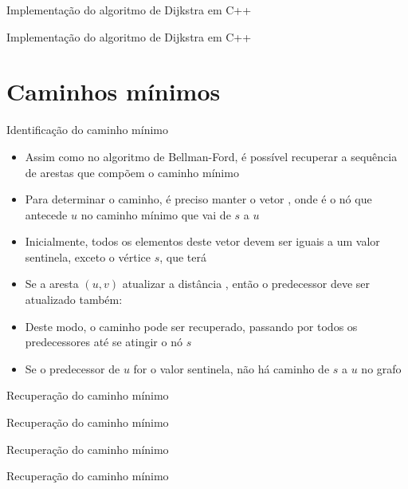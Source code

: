 \begin{frame}[fragile]{Implementação do algoritmo de Dijkstra em C++}
\end{frame}

\begin{frame}[fragile]{Implementação do algoritmo de Dijkstra em C++}
\end{frame}

\section{Caminhos mínimos}


\begin{frame}[fragile]{Identificação do caminho mínimo}

    \begin{itemize}
        \item Assim como no algoritmo de Bellman-Ford, é possível recuperar a sequência de 
            arestas que compõem o caminho mínimo

        \item Para determinar o caminho, é preciso manter o vetor , onde
             é o nó que antecede $u$ no caminho mínimo que vai de $s$ a 
            $u$

        \item Inicialmente, todos os elementos deste vetor devem ser iguais a um valor sentinela,
            exceto o vértice $s$, que terá 

        \item Se a aresta $(u, v)$ atualizar a distância , então o 
            predecessor deve ser atualizado também: 

        \item Deste modo, o caminho pode ser recuperado, passando por todos os predecessores até
            se atingir o nó $s$

        \item Se o predecessor de $u$ for o valor sentinela, não há caminho de $s$ a $u$ no
            grafo
    \end{itemize}

\end{frame}

\begin{frame}[fragile]{Recuperação do caminho mínimo}
\end{frame}

\begin{frame}[fragile]{Recuperação do caminho mínimo}
\end{frame}

\begin{frame}[fragile]{Recuperação do caminho mínimo}
\end{frame}

\begin{frame}[fragile]{Recuperação do caminho mínimo}
\end{frame}
